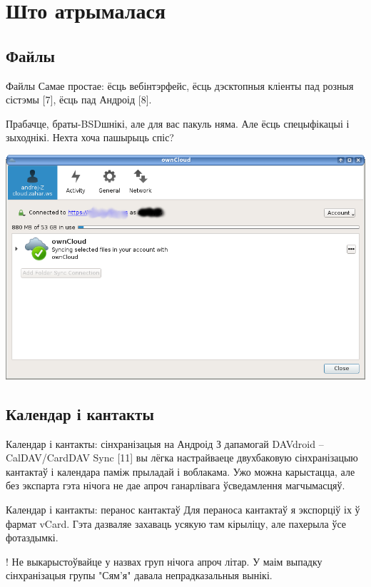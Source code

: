 \documentclass[ignorenonframetext,hyperref={pdftex,unicode}]{beamer}
\begin{document}
\section{Што атрымалася}
\subsection{Файлы}
\begin{frame}{Файлы}
	Самае простае: ёсць вебінтэрфейс, ёсць дэсктопныя кліенты пад розныя сістэмы [7], ёсць пад Андроід [8]. 

	Прабачце, браты-BSDшнікі, але для вас пакуль няма. Але ёсць спецыфікацыі і зыходнікі. Нехта хоча пашырыць спіс?
	
	\begin{center}
 		\includegraphics[height=0.6\textheight,keepaspectratio]{d_client}
	\end{center}
\end{frame}

\subsection{Календар і кантакты}
\begin{frame}{Календар і кантакты: сінхранізацыя на Андроід}
	З дапамогай DAVdroid – CalDAV/CardDAV Sync [11] вы лёгка настрайваеце двухбаковую сінхранізацыю кантактаў і календара паміж прыладай і воблакама. Ужо можна карыстацца, але без экспарта гэта нічога не дае апроч ганарлівага ўсведамлення магчымасцяў.
\end{frame}

\begin{frame}{Календар і кантакты: перанос кантактаў}
	Для пераноса кантактаў я экспорціў іх ў фармат vCard. Гэта дазваляе захаваць усякую там кірыліцу, але пахерыла ўсе фотаздымкі.

	{!} Не выкарыстоўвайце у назвах груп нічога апроч літар. У маім выпадку сінхранізацыя групы "Сям'я" давала непрадказальныя вынікі.
\end{frame}
\end{document}

